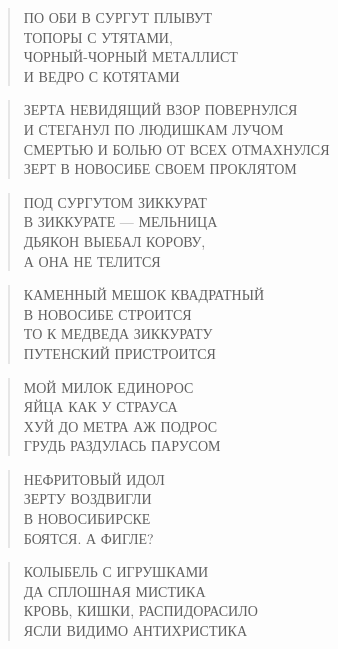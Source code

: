 \poemtitle{***}
\begin{verse}
ПО ОБИ В СУРГУТ ПЛЫВУТ\\
ТОПОРЫ С УТЯТАМИ,\\
ЧОРНЫЙ-ЧОРНЫЙ МЕТАЛЛИСТ\\
И ВЕДРО С КОТЯТАМИ
\end{verse}

\poemtitle{***}
\begin{verse}
ЗЕРТА НЕВИДЯЩИЙ ВЗОР ПОВЕРНУЛСЯ\\
И СТЕГАНУЛ ПО ЛЮДИШКАМ ЛУЧОМ\\
СМЕРТЬЮ И БОЛЬЮ ОТ ВСЕХ ОТМАХНУЛСЯ\\
ЗЕРТ В НОВОСИБЕ СВОЕМ ПРОКЛЯТОМ
\end{verse}

\poemtitle{***}
\begin{verse}
ПОД СУРГУТОМ ЗИККУРАТ\\
В ЗИККУРАТЕ — МЕЛЬНИЦА\\
ДЬЯКОН ВЫЕБАЛ КОРОВУ,\\
А ОНА НЕ ТЕЛИТСЯ
\end{verse}

\poemtitle{***}
\begin{verse}
КАМЕННЫЙ МЕШОК КВАДРАТНЫЙ\\
В НОВОСИБЕ СТРОИТСЯ\\
ТО К МЕДВЕДА ЗИККУРАТУ\\
ПУТЕНСКИЙ ПРИСТРОИТСЯ
\end{verse}

\poemtitle{***}
\begin{verse}
МОЙ МИЛОК ЕДИНОРОС\\
ЯЙЦА КАК У СТРАУСА\\
ХУЙ ДО МЕТРА АЖ ПОДРОС\\
ГРУДЬ РАЗДУЛАСЬ ПАРУСОМ
\end{verse}

\poemtitle{***}
\begin{verse}
НЕФРИТОВЫЙ ИДОЛ \\
ЗЕРТУ ВОЗДВИГЛИ \\
В НОВОСИБИРСКЕ\\
БОЯТСЯ. А ФИГЛЕ?
\end{verse}

\poemtitle{***}
\begin{verse}
КОЛЫБЕЛЬ С ИГРУШКАМИ\\
ДА СПЛОШНАЯ МИСТИКА\\
КРОВЬ, КИШКИ, РАСПИДОРАСИЛО\\
ЯСЛИ ВИДИМО АНТИХРИСТИКА
\end{verse}

